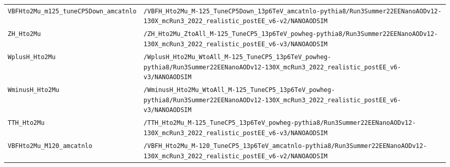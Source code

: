 \begin{longtable}{@{}>{\RaggedRight\arraybackslash}p{} >{\RaggedRight\arraybackslash}p{}@{}}
\addlinespace[2pt]
\texttt{VBFHto2Mu\_\allowbreak{}m125\_\allowbreak{}tuneCP5Down\_\allowbreak{}amcatnlo} & \texttt{/\allowbreak{}VBFH\_\allowbreak{}Hto2Mu\_\allowbreak{}M-\allowbreak{}125\_\allowbreak{}TuneCP5Down\_\allowbreak{}13p6TeV\_\allowbreak{}amcatnlo-\allowbreak{}pythia8/\allowbreak{}Run3Summer22EENanoAODv12-\allowbreak{}130X\_\allowbreak{}mcRun3\_\allowbreak{}2022\_\allowbreak{}realistic\_\allowbreak{}postEE\_\allowbreak{}v6-\allowbreak{}v2/\allowbreak{}NANOAODSIM} \\
\addlinespace[2pt]
\texttt{ZH\_\allowbreak{}Hto2Mu} & \texttt{/\allowbreak{}ZH\_\allowbreak{}Hto2Mu\_\allowbreak{}ZtoAll\_\allowbreak{}M-\allowbreak{}125\_\allowbreak{}TuneCP5\_\allowbreak{}13p6TeV\_\allowbreak{}powheg-\allowbreak{}pythia8/\allowbreak{}Run3Summer22EENanoAODv12-\allowbreak{}130X\_\allowbreak{}mcRun3\_\allowbreak{}2022\_\allowbreak{}realistic\_\allowbreak{}postEE\_\allowbreak{}v6-\allowbreak{}v3/\allowbreak{}NANOAODSIM} \\
\addlinespace[2pt]
\texttt{WplusH\_\allowbreak{}Hto2Mu} & \texttt{/\allowbreak{}WplusH\_\allowbreak{}Hto2Mu\_\allowbreak{}WtoAll\_\allowbreak{}M-\allowbreak{}125\_\allowbreak{}TuneCP5\_\allowbreak{}13p6TeV\_\allowbreak{}powheg-\allowbreak{}pythia8/\allowbreak{}Run3Summer22EENanoAODv12-\allowbreak{}130X\_\allowbreak{}mcRun3\_\allowbreak{}2022\_\allowbreak{}realistic\_\allowbreak{}postEE\_\allowbreak{}v6-\allowbreak{}v3/\allowbreak{}NANOAODSIM} \\
\addlinespace[2pt]
\texttt{WminusH\_\allowbreak{}Hto2Mu} & \texttt{/\allowbreak{}WminusH\_\allowbreak{}Hto2Mu\_\allowbreak{}WtoAll\_\allowbreak{}M-\allowbreak{}125\_\allowbreak{}TuneCP5\_\allowbreak{}13p6TeV\_\allowbreak{}powheg-\allowbreak{}pythia8/\allowbreak{}Run3Summer22EENanoAODv12-\allowbreak{}130X\_\allowbreak{}mcRun3\_\allowbreak{}2022\_\allowbreak{}realistic\_\allowbreak{}postEE\_\allowbreak{}v6-\allowbreak{}v3/\allowbreak{}NANOAODSIM} \\
\addlinespace[2pt]
\texttt{TTH\_\allowbreak{}Hto2Mu} & \texttt{/\allowbreak{}TTH\_\allowbreak{}Hto2Mu\_\allowbreak{}M-\allowbreak{}125\_\allowbreak{}TuneCP5\_\allowbreak{}13p6TeV\_\allowbreak{}powheg-\allowbreak{}pythia8/\allowbreak{}Run3Summer22EENanoAODv12-\allowbreak{}130X\_\allowbreak{}mcRun3\_\allowbreak{}2022\_\allowbreak{}realistic\_\allowbreak{}postEE\_\allowbreak{}v6-\allowbreak{}v3/\allowbreak{}NANOAODSIM} \\
\addlinespace[2pt]
\texttt{VBFHto2Mu\_\allowbreak{}M120\_\allowbreak{}amcatnlo} & \texttt{/\allowbreak{}VBFH\_\allowbreak{}Hto2Mu\_\allowbreak{}M-\allowbreak{}120\_\allowbreak{}TuneCP5\_\allowbreak{}13p6TeV\_\allowbreak{}amcatnlo-\allowbreak{}pythia8/\allowbreak{}Run3Summer22EENanoAODv12-\allowbreak{}130X\_\allowbreak{}mcRun3\_\allowbreak{}2022\_\allowbreak{}realistic\_\allowbreak{}postEE\_\allowbreak{}v6-\allowbreak{}v2/\allowbreak{}NANOAODSIM} \\

\end{longtable}

